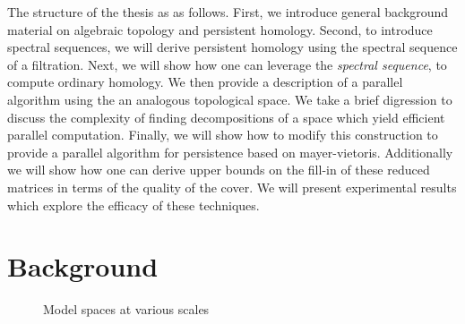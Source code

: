 The structure of the thesis as as follows. First, we introduce general background material on algebraic topology and persistent homology. Second, to introduce spectral sequences, we will derive persistent homology using the spectral sequence of a filtration. Next, we will show how one can leverage the \emph{\mv spectral sequence}, to compute ordinary homology. We then provide a description of a parallel algorithm using the \mvb{} an analogous topological space. We take a brief digression to discuss the complexity of finding decompositions of a space which yield efficient parallel computation. Finally, we will show how to modify this construction to provide a parallel algorithm for persistence based on mayer-vietoris. Additionally we will show how one can derive upper bounds on the fill-in of these reduced matrices in terms of the quality of the cover. We will present experimental results which explore the efficacy of these techniques.

\section{Background}

 \begin{figure}
\centering
 \hspace{.5cm}
 \hspace{.25cm}
 \hspace{.25cm}
\caption{Model spaces at various scales}
\label{model-spaces}
\end{figure}

